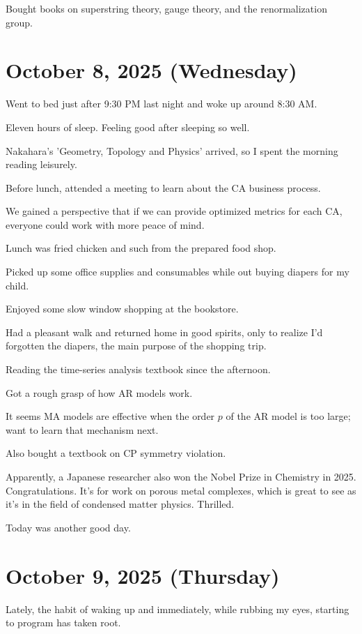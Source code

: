 \documentclass{article}
\begin{document}
Bought books on superstring theory, gauge theory, and the renormalization group.

\section{October 8, 2025 (Wednesday)}

Went to bed just after 9:30 PM last night and woke up around 8:30 AM.

Eleven hours of sleep. Feeling good after sleeping so well.

Nakahara's 'Geometry, Topology and Physics' arrived, so I spent the morning reading leisurely.

Before lunch, attended a meeting to learn about the CA business process.

We gained a perspective that if we can provide optimized metrics for each CA, everyone could work with more peace of mind.

Lunch was fried chicken and such from the prepared food shop.

Picked up some office supplies and consumables while out buying diapers for my child.

Enjoyed some slow window shopping at the bookstore.

Had a pleasant walk and returned home in good spirits, only to realize I'd forgotten the diapers, the main purpose of the shopping trip.

Reading the time-series analysis textbook since the afternoon.

Got a rough grasp of how AR models work.

It seems MA models are effective when the order $p$ of the AR model is too large; want to learn that mechanism next.

Also bought a textbook on CP symmetry violation.

Apparently, a Japanese researcher also won the Nobel Prize in Chemistry in 2025. Congratulations. It's for work on porous metal complexes, which is great to see as it's in the field of condensed matter physics. Thrilled.

Today was another good day.

\section{October 9, 2025 (Thursday)}

Lately, the habit of waking up and immediately, while rubbing my eyes, starting to program has taken root.
\end{document}
